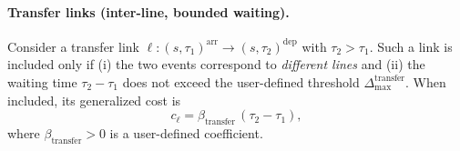 \paragraph{Transfer links (inter-line, bounded waiting).}
Consider a transfer link $\ell:(s,\tau_1)^{\mathrm{arr}}\rightarrow(s,\tau_2)^{\mathrm{dep}}$
with $\tau_2>\tau_1$.
Such a link is included only if (i) the two events correspond to \emph{different lines}
and (ii) the waiting time $\tau_2-\tau_1$ does not exceed the user-defined threshold
$\Delta_{\max}^{\mathrm{transfer}}$.
When included, its generalized cost is
\[
c_\ell = \beta_{\mathrm{transfer}}\,(\tau_2-\tau_1),
\]
where $\beta_{\mathrm{transfer}}>0$ is a user-defined coefficient.

